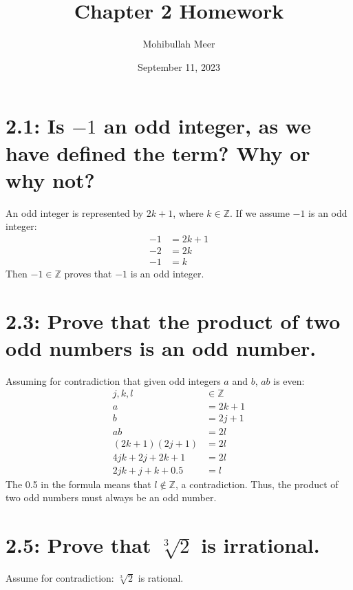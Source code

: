 \documentclass{article}
\title{Chapter 2 Homework}
\author{Mohibullah Meer}
\date{September 11, 2023}
\begin{document}
\maketitle

\section*{2.1: Is $-1$ an odd integer, as we have defined the term? Why or why not?}

An odd integer is represented by $2k+1$, where $k\in\mathbb{Z}$. If we assume $-1$ is an odd integer:
\begin{align*}
  -1&=2k+1\\
  -2&=2k\\
  -1&=k
\end{align*}
Then $-1\in\mathbb{Z}$ proves that $-1$ is an odd integer.

\section*{2.3: Prove that the product of two odd numbers is an odd number.}

Assuming for contradiction that given odd integers $a$ and $b$, $ab$ is even:
\begin{align*}
  j,k,l&\in\mathbb{Z}\\
  a&=2k+1\\
  b&=2j+1\\
  ab&=2l\\
  (2k+1)(2j+1)&=2l\\
  4jk+2j+2k+1&=2l\\
  2jk+j+k+0.5&=l
\end{align*}
The 0.5 in the formula means that $l\not\in\mathbb{Z}$, a contradiction. Thus, the product of two odd numbers must always be an odd number.

\section*{2.5: Prove that $\sqrt[3]{2}$ is irrational.}

Assume for contradiction: $\sqrt[3]{2}$ is rational.
\end{document}
